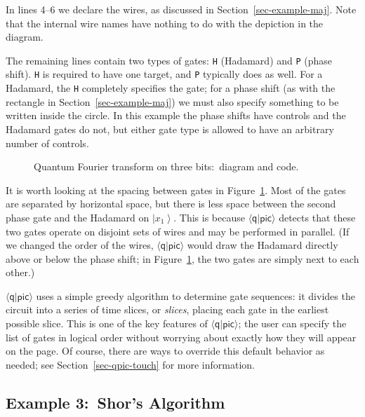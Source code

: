 \documentclass[twoside,12pt]{article}
\newcommand{\qpic}{$\langle\mathsf{q}|\mathsf{pic}\rangle$\xspace}
\providecommand{\ket}[1]{\left|#1\right\rangle}
\begin{document}
In lines 4--6 we declare the wires, as discussed in
Section~\ref{sec-example-maj}.  Note that the internal wire names have
nothing to do with the depiction in the diagram.

The remaining lines contain two types of gates:
{\tt H} (Hadamard) and {\tt P} (phase shift).  {\tt H} is required to have
one target, and {\tt P} typically does as well.
For a Hadamard, the {\tt H} completely specifies the gate;
for a phase shift (as with the rectangle in Section~\ref{sec-example-maj})
we must also specify something to be written inside the circle.  In this
example the phase shifts have controls and the Hadamard gates do not, but
either gate type is allowed to have an arbitrary number of controls.
\begin{figure}[h!]
\begin{center}


\begin{minipage}{5in}

\end{minipage}
\end{center}
\caption{Quantum Fourier transform on three bits:\ diagram and code.}
\label{fig-QFT}
\end{figure}


It is worth looking at the spacing between gates in Figure~\ref{fig-QFT}.
Most of the gates are separated by horizontal space, but there is less space
between the second phase gate and the Hadamard on $\ket{x_1}$.  This is
because \qpic detects that these two gates operate on disjoint sets of
wires and may be performed in parallel.  (If we changed the order of the
wires, \qpic would draw the Hadamard directly above or below the
phase shift; in Figure~\ref{fig-QFT}, the two gates are simply next to each other.)


\qpic uses a simple greedy algorithm to determine gate sequences:  it
divides the circuit into a series of time slices, or \emph{slices}, placing each gate
in the earliest possible slice.  This is one of the key features of
\qpic; the user can specify the list of gates in logical order without
worrying about exactly how they will appear on the page.  Of course, there
are ways to override this default behavior as needed; see
Section~\ref{sec-qpic-touch} for more information.

\subsection{Example 3:\ Shor's Algorithm}
\end{document}
